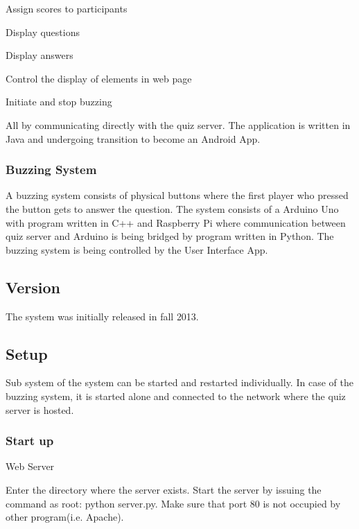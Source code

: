 \begin{DoxyItemize}
\item Assign scores to participants
\item Display questions
\item Display answers
\item Control the display of elements in web page
\item Initiate and stop buzzing

All by communicating directly with the quiz server. The application is written in Java and undergoing transition to become an Android App.
\end{DoxyItemize}

\subsubsection*{Buzzing System}

A buzzing system consists of physical buttons where the first player who pressed the button gets to answer the question. The system consists of a Arduino Uno with program written in C++ and Raspberry Pi where communication between quiz server and Arduino is being bridged by program written in Python. The buzzing system is being controlled by the User Interface App.

\subsection*{Version}

The system was initially released in fall 2013.

\subsection*{Setup}

Sub system of the system can be started and restarted individually. In case of the buzzing system, it is started alone and connected to the network where the quiz server is hosted.

\subsubsection*{Start up}


\begin{DoxyEnumerate}
\item Web Server
\end{DoxyEnumerate}

Enter the directory where the server exists. Start the server by issuing the command as root\+: python server.\+py. Make sure that port 80 is not occupied by other program(i.\+e. Apache).


